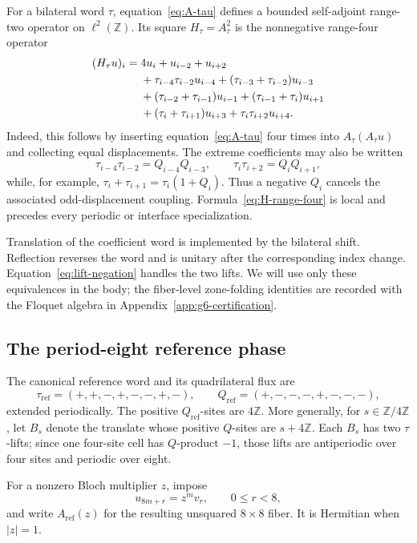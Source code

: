 For a bilateral word \(\tau\), equation~\eqref{eq:A-tau} defines a bounded
self-adjoint range-two operator on \(\ell^2(\mathbb Z)\).  Its square
\(H_\tau=A_\tau^2\) is the nonnegative range-four operator
\begin{align}
(H_\tau u)_i={}&4u_i+u_{i-2}+u_{i+2}\notag\\
&+\tau_{i-4}\tau_{i-2}u_{i-4}
+(\tau_{i-3}+\tau_{i-2})u_{i-3}\notag\\
&+(\tau_{i-2}+\tau_{i-1})u_{i-1}
+(\tau_{i-1}+\tau_i)u_{i+1}\notag\\
&+(\tau_i+\tau_{i+1})u_{i+3}
+\tau_i\tau_{i+2}u_{i+4}.
\label{eq:H-range-four}
\end{align}
Indeed, this follows by inserting equation~\eqref{eq:A-tau} four times into
\(A_\tau(A_\tau u)\) and collecting equal displacements.  The extreme
coefficients may also be written
\[
\tau_{i-4}\tau_{i-2}=Q_{i-4}Q_{i-3},
\qquad
\tau_i\tau_{i+2}=Q_iQ_{i+1},
\]
while, for example,
\(\tau_i+\tau_{i+1}=\tau_i(1+Q_i)\).  Thus a negative \(Q_i\) cancels the
associated odd-displacement coupling.  Formula~\eqref{eq:H-range-four} is
local and precedes every periodic or interface specialization.

Translation of the coefficient word is implemented by the bilateral shift.
Reflection reverses the word and is unitary after the corresponding index
change.  Equation~\eqref{eq:lift-negation} handles the two lifts.  We will
use only these equivalences in the body; the fiber-level
zone-folding identities are recorded with the Floquet algebra in
Appendix~\ref{app:g6-certification}.

\subsection{The period-eight reference phase}
\label{subsec:period-eight-reference-phase}

The canonical reference word and its quadrilateral flux are
\[
\tau_{\mathrm{ref}}=(+,+,-,+,-,-,+,-),
\qquad
Q_{\mathrm{ref}}=(+,-,-,-,+,-,-,-),
\]
extended periodically. The positive \(Q_{\mathrm{ref}}\)-sites are
\(4\mathbb Z\).  More generally, for \(s\in\mathbb Z/4\mathbb Z\), let
\(B_s\) denote the translate whose positive \(Q\)-sites are
\(s+4\mathbb Z\).  Each \(B_s\) has two \(\tau\)-lifts; since one four-site
cell has \(Q\)-product \(-1\), those lifts are antiperiodic over four sites
and periodic over eight.

For a nonzero Bloch multiplier \(z\), impose
\[
u_{8m+r}=z^m v_r,\qquad 0\leq r<8,
\]
and write \(A_{\mathrm{ref}}(z)\) for the resulting unsquared \(8\times8\)
fiber.  It is Hermitian when \(|z|=1\).

